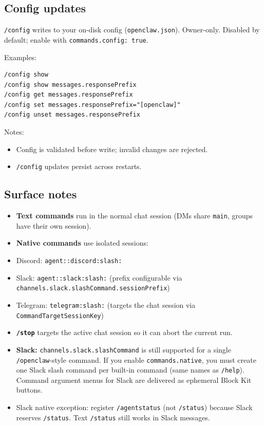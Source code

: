 \subsection{Config updates}


\texttt{/config} writes to your on-disk config (\texttt{openclaw.json}). Owner-only. Disabled by default; enable with \texttt{commands.config: true}.

Examples:

\begin{lstlisting}
/config show
/config show messages.responsePrefix
/config get messages.responsePrefix
/config set messages.responsePrefix="[openclaw]"
/config unset messages.responsePrefix
\end{lstlisting}


Notes:

\begin{itemize}
  \item Config is validated before write; invalid changes are rejected.
  \item \texttt{/config} updates persist across restarts.
\end{itemize}


\subsection{Surface notes}


\begin{itemize}
  \item \textbf{Text commands} run in the normal chat session (DMs share \texttt{main}, groups have their own session).
  \item \textbf{Native commands} use isolated sessions:
  \item Discord: \texttt{agent::discord:slash:}
  \item Slack: \texttt{agent::slack:slash:} (prefix configurable via \texttt{channels.slack.slashCommand.sessionPrefix})
  \item Telegram: \texttt{telegram:slash:} (targets the chat session via \texttt{CommandTargetSessionKey})
  \item \textbf{\texttt{/stop}} targets the active chat session so it can abort the current run.
  \item \textbf{Slack:} \texttt{channels.slack.slashCommand} is still supported for a single \texttt{/openclaw}-style command. If you enable \texttt{commands.native}, you must create one Slack slash command per built-in command (same names as \texttt{/help}). Command argument menus for Slack are delivered as ephemeral Block Kit buttons.
  \item Slack native exception: register \texttt{/agentstatus} (not \texttt{/status}) because Slack reserves \texttt{/status}. Text \texttt{/status} still works in Slack messages.
\end{itemize}




